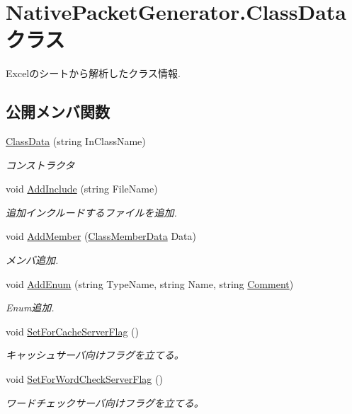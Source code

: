 \hypertarget{classNativePacketGenerator_1_1ClassData}{}\section{Native\+Packet\+Generator.\+Class\+Data クラス}
\label{classNativePacketGenerator_1_1ClassData}


Excelのシートから解析したクラス情報.  


\subsection*{公開メンバ関数}
\begin{DoxyCompactItemize}
\item 
\mbox{\hyperlink{classNativePacketGenerator_1_1ClassData_aea0289ee3086a4157ae1e6b1278bb63b}{Class\+Data}} (string In\+Class\+Name)
\begin{DoxyCompactList}\small\item\em コンストラクタ \end{DoxyCompactList}\item 
void \mbox{\hyperlink{classNativePacketGenerator_1_1ClassData_a20ce7909453ff018fd7a7c9fb83f25e7}{Add\+Include}} (string File\+Name)
\begin{DoxyCompactList}\small\item\em 追加インクルードするファイルを追加. \end{DoxyCompactList}\item 
void \mbox{\hyperlink{classNativePacketGenerator_1_1ClassData_acc79c0c995d1965840714e736249800e}{Add\+Member}} (\mbox{\hyperlink{structNativePacketGenerator_1_1ClassMemberData}{Class\+Member\+Data}} Data)
\begin{DoxyCompactList}\small\item\em メンバ追加. \end{DoxyCompactList}\item 
void \mbox{\hyperlink{classNativePacketGenerator_1_1ClassData_a1b4737fa85d6a577aed5adc3987ee61b}{Add\+Enum}} (string Type\+Name, string Name, string \mbox{\hyperlink{classNativePacketGenerator_1_1ClassData_a7d166d01f44d0774b52fb30a0ceee6ba}{Comment}})
\begin{DoxyCompactList}\small\item\em Enum追加. \end{DoxyCompactList}\item 
void \mbox{\hyperlink{classNativePacketGenerator_1_1ClassData_ae935d137b63d28d6ac48d90a8b782f21}{Set\+For\+Cache\+Server\+Flag}} ()
\begin{DoxyCompactList}\small\item\em キャッシュサーバ向けフラグを立てる。 \end{DoxyCompactList}\item 
void \mbox{\hyperlink{classNativePacketGenerator_1_1ClassData_adb1f8de945f766875c98195a5b556acc}{Set\+For\+Word\+Check\+Server\+Flag}} ()
\begin{DoxyCompactList}\small\item\em ワードチェックサーバ向けフラグを立てる。 \end{DoxyCompactList}\end{DoxyCompactItemize}
